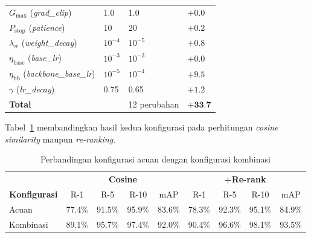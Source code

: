 \begin{table}[htbp]
\begin{tabular}{llll}
        $G_{\max}$ (\textit{grad\_clip})                 & 1{.}0             & 1{.}0              & $+0{.}0$                      \\
        $P_{\text{stop}}$ (\textit{patience})            & 10                & 20                 & $+0{.}2$                      \\
        $\lambda_w$ (\textit{weight\_decay})             & $10^{-4}$         & $10^{-5}$          & $+0{.}8$                      \\
        $\eta_{\text{base}}$ (\textit{base\_lr})         & $10^{-3}$         & $10^{-3}$          & $+0{.}0$                      \\
        $\eta_{\text{bb}}$ (\textit{backbone\_base\_lr}) & $10^{-5}$         & $10^{-4}$          & $+9{.}5$                      \\
        $\gamma$ (\textit{lr\_decay})                    & 0{.}75            & 0{.}65             & $+1{.}2$                      \\
        \hline
        \textbf{Total}                                   &                   & 12 perubahan       & $\mathbf{+33{.}7}$            \\
        \hline
    \end{tabular}
\end{table}

Tabel~\ref{tab:optimal_combo} membandingkan hasil kedua konfigurasi pada perhitungan \textit{cosine similarity} maupun \textit{re-ranking}.

\begin{table}[htbp]
    \centering
    \caption{Perbandingan konfigurasi acuan dengan konfigurasi kombinasi}
    \label{tab:optimal_combo}
    \renewcommand{\arraystretch}{1.3}
    \begin{tabular}{lcccccccc}
        \hline
                             & \multicolumn{4}{c}{\textbf{Cosine}} & \multicolumn{4}{c}{\textbf{+Re-rank}}                                                       \\
        \textbf{Konfigurasi} & R-1                                 & R-5                                   & R-10   & mAP    & R-1    & R-5    & R-10   & mAP    \\
        \hline
        Acuan                & 77.4\%                              & 91.5\%                                & 95.9\% & 83.6\% & 78.3\% & 92.3\% & 95.1\% & 84.9\% \\
        Kombinasi            & 89.1\%                              & 95.7\%                                & 97.4\% & 92.0\% & 90.4\% & 96.6\% & 98.1\% & 93.5\% \\
        \hline
    \end{tabular}
\end{table}

